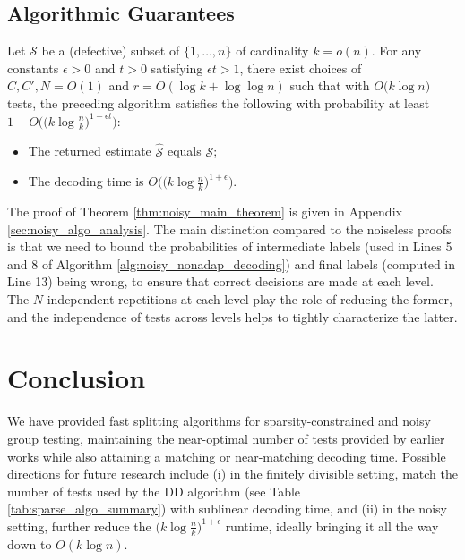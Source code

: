 \subsection{Algorithmic Guarantees} \label{sec:noisy_algo_guaran}

\begin{theorem} \label{thm:noisy_main_theorem}
    Let $\mathcal{S}$ be a (defective) subset of $\{1,\dots,n\}$ of cardinality $k=o(n)$. For any constants $\epsilon > 0$ and $t > 0$ satisfying $\epsilon t>1$, there exist choices of $C,C',N = O(1)$ and $r = O(\log k + \log\log n)$ such that with $O\big(k\log n\big)$ tests, the preceding algorithm satisfies the following with probability at least $1-O\big(\big(k\log\frac{n}{k}\big)^{1-\epsilon t}\big)$:
    \begin{itemize}
        \item The returned estimate $\widehat{\mathcal{S}}$ equals $\mathcal{S}$;
        \item The decoding time is $O\big(\big(k\log\frac{n}{k}\big)^{1+\epsilon}\big)$.
    \end{itemize}
\end{theorem}
The proof of Theorem \ref{thm:noisy_main_theorem} is given in Appendix \ref{sec:noisy_algo_analysis}.  The main distinction compared to the noiseless proofs is that we need to bound the probabilities of intermediate labels (used in Lines 5 and 8 of Algorithm \ref{alg:noisy_nonadap_decoding}) and final labels (computed in Line 13) being wrong, to ensure that correct decisions are made at each level.  The $N$ independent repetitions at each level play the role of reducing the former, and the independence of tests across levels helps to tightly characterize the latter.


\section{Conclusion} \label{sec:conclusion}

We have provided fast splitting algorithms for sparsity-constrained and noisy group testing, maintaining the near-optimal number of tests provided by earlier works while also attaining a matching or near-matching decoding time.  Possible directions for future research include (i) in the finitely divisible setting, match the number of tests used by the DD algorithm (see Table \ref{tab:sparse_algo_summary}) with sublinear decoding time, and (ii) in the noisy setting, further reduce the $\big( k \log \frac{n}{k} \big)^{1+\epsilon}$ runtime, ideally bringing it all the way down to $O(k \log n)$.  

